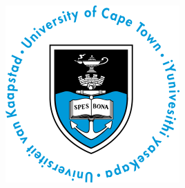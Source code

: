 \documentclass[
11pt, %
oneside, %
english, %
singlespacing, %
headsepline, %
]{MastersDoctoralThesis} %
\author{Devon \textsc{Stone}} %
\begin{document}
\frontmatter %
\pagestyle{plain} %


\begin{titlepage}
\begin{center}

\vspace*{.06\textheight}
{\scshape\huge \univname\par}\vspace{1cm} %
\includegraphics[width=0.5\textwidth]{images/logo.png}\\[0.6cm] %
\HRule \\[0.4cm] %
{\huge \bfseries \ttitle\par}\vspace{0.4cm} %
\HRule \\[1.5cm] %
 

\end{center}
\end{titlepage}
\end{document}
